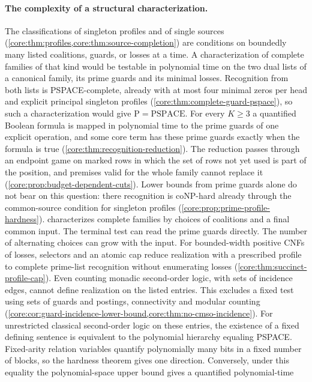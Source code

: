 \paragraph{The complexity of a structural characterization.}
The classifications of singleton profiles and of single sources
(\cref{core:thm:profiles,core:thm:source-completion}) are conditions on
boundedly many listed coalitions, guards, or losses at a time. A
characterization of complete families of that kind would be testable in
polynomial time on the two dual lists of a canonical family, its prime
guards and its minimal losses. Recognition from both lists is
PSPACE-complete, already with at most four minimal zeros per head and
explicit principal singleton profiles
(\cref{core:thm:complete-guard-pspace}), so such a characterization
would give $\mathrm P=\mathrm{PSPACE}$. For every $K\ge3$ a quantified
Boolean formula is mapped in polynomial time to the prime guards of one
explicit operation, and some core term has these prime guards exactly
when the formula is true
(\cref{core:thm:recognition-reduction}). The reduction passes through an
endpoint game on marked rows in which the set of rows not yet used is
part of the position, and premises valid for the whole family cannot
replace it (\cref{core:prop:budget-dependent-cuts}). Lower bounds from
prime guards alone do not bear on this question: there recognition is
coNP-hard already through the common-source condition for singleton
profiles (\cref{core:prop:prime-profile-hardness}).
 characterizes complete
families by choices of coalitions and a final common input. The
terminal test can read the prime guards directly. The number of
alternating choices can grow with the input. For bounded-width
positive CNFs of losses, selectors and an atomic cap reduce realization
with a prescribed profile to complete prime-list recognition without
enumerating losses (\cref{core:thm:succinct-profile-cap}).
Even counting monadic second-order logic, with sets of
incidence edges, cannot define realization on the listed entries.
This excludes a fixed test using sets of guards and postings,
connectivity and modular counting
(\cref{core:cor:guard-incidence-lower-bound,core:thm:no-cmso-incidence}). For unrestricted classical second-order logic on these entries,
the existence of a fixed defining sentence is equivalent to the
polynomial hierarchy equaling PSPACE. Fixed-arity relation variables
quantify polynomially many bits in a fixed number of blocks, so the
hardness theorem gives one direction. Conversely, under this equality
the polynomial-space upper bound gives a quantified polynomial-time
